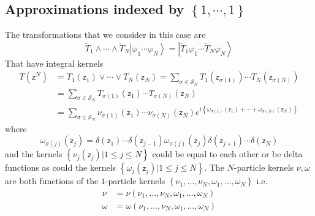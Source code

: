 \documentclass[aps,preprint]{revtex4}%
\begin{document}
\subsection{Approximations indexed by $\left\{  1,\cdots,1\right\}  $}

The transformations that we consider in this case are
\begin{equation}
\breve{T}_{1}\wedge\cdots\wedge\breve{T}_{N}\left\vert \varphi_{1}%
\cdots\varphi_{N}\right\rangle =\left\vert \breve{T}_{1}\varphi_{1}%
\cdots\breve{T}_{N}\varphi_{N}\right\rangle
\end{equation}
That have integral kernels
\begin{align}
T\left(  \mathsf{z}^{N}\right)   &  =T_{1}\left(  \mathsf{z}_{1}\right)
\vee\cdots\vee T_{N}\left(  \mathsf{z}_{N}\right)  =%
{\textstyle\sum\limits_{\sigma\in\mathcal{S}_{N}}}
T_{1}\left(  \mathsf{z}_{\sigma\left(  1\right)  }\right)  \cdots T_{N}\left(
\mathsf{z}_{\sigma\left(  N\right)  }\right) \nonumber\\
&  =%
{\textstyle\sum\limits_{\sigma\in\mathcal{S}_{N}}}
T_{\sigma\left(  1\right)  }\left(  \mathsf{z}_{1}\right)  \cdots
T_{\sigma\left(  N\right)  }\left(  \mathsf{z}_{N}\right) \nonumber\\
&  =\sum_{\sigma\in\mathcal{S}_{N}}\nu_{\sigma\left(  1\right)  }\left(
\mathsf{z}_{1}\right)  \cdots\nu_{\sigma\left(  N\right)  }\left(
\mathsf{z}_{N}\right)  e^{i\left\{  \omega_{\sigma\left(  1\right)  }\left(
\mathsf{z}_{1}\right)  +\cdots+\omega_{\sigma\left(  N\right)  }\left(
\mathsf{z}_{N}\right)  \right\}  }%
\end{align}
where
\begin{equation}
\omega_{\sigma\left(  j\right)  }\left(  \mathsf{z}_{j}\right)  =\delta\left(
\mathsf{z}_{1}\right)  \cdots\delta\left(  \mathsf{z}_{j-1}\right)
\omega_{\sigma\left(  j\right)  }\left(  \mathsf{z}_{j}\right)  \delta\left(
\mathsf{z}_{j+1}\right)  \cdots\delta\left(  \mathsf{z}_{N}\right)
\end{equation}
and the kernels $\left\{  \nu_{j}\left(  \mathsf{z}_{j}\right)  |1\leq j\leq
N\right\}  $ could be equal to each other or be delta functions as could the
kernels $\left\{  \omega_{j}\left(  \mathsf{z}_{j}\right)  |1\leq j\leq
N\right\}  $. The $N$-particle kernels $\nu,\omega$ are both functions of the
$1$-particle kernels $\left\{  \nu_{1},\ldots,\nu_{N},\omega_{1},\ldots
,\omega_{N}\right\}  $ i.e.%
\begin{align}
\nu &  =\nu\left(  \nu_{1},\ldots,\nu_{N},\omega_{1},\ldots,\omega_{N}\right)
\nonumber\\
\omega &  =\omega\left(  \nu_{1},\ldots,\nu_{N},\omega_{1},\ldots,\omega
_{N}\right)
\end{align}
\end{document}
